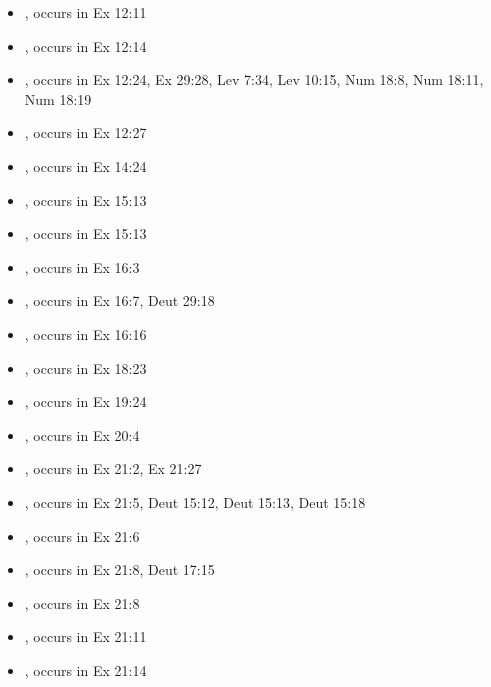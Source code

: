 \documentclass[14pt]{article}
\begin{document}
\begin{itemize}
\item {}, occurs in Ex 12:11

\item {}, occurs in Ex 12:14

\item {}, occurs in Ex 12:24, Ex 29:28, Lev 7:34, Lev 10:15, Num 18:8, Num 18:11, Num 18:19

\item {}, occurs in Ex 12:27

\item {}, occurs in Ex 14:24

\item {}, occurs in Ex 15:13

\item {}, occurs in Ex 15:13

\item {}, occurs in Ex 16:3

\item {}, occurs in Ex 16:7, Deut 29:18

\item {}, occurs in Ex 16:16

\item {}, occurs in Ex 18:23

\item {}, occurs in Ex 19:24

\item {}, occurs in Ex 20:4

\item {}, occurs in Ex 21:2, Ex 21:27

\item {}, occurs in Ex 21:5, Deut 15:12, Deut 15:13, Deut 15:18

\item {}, occurs in Ex 21:6

\item {}, occurs in Ex 21:8, Deut 17:15

\item {}, occurs in Ex 21:8

\item {}, occurs in Ex 21:11

\item {}, occurs in Ex 21:14


\end{itemize}
\end{document}
